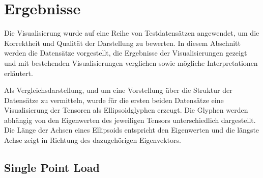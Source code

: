 \documentclass[a4paper,fontsize=12pt,toc=bib,halfparskip,ngerman]{scrartcl}
\begin{document}
\section{Ergebnisse}
\label{sec:Ergebnisse}
Die Visualisierung wurde auf eine Reihe von Testdatens\"atzen angewendet, um die Korrektheit und Qualit\"at der Darstellung zu bewerten. In diesem Abschnitt werden die Datens\"atze vorgestellt, die Ergebnisse der Visualisierungen gezeigt und mit bestehenden Visualisierungen verglichen sowie m\"ogliche Interpretationen erl\"autert.

Als Vergleichsdarstellung, und um eine Vorstellung \"uber die Struktur der Datens\"atze zu vermitteln, wurde f\"ur die ersten beiden Datens\"atze eine Visualisierung der Tensoren als Ellipsoidglyphen erzeugt. Die Glyphen werden abh\"angig von den Eigenwerten des jeweiligen Tensors unterschiedlich dargestellt. Die L\"ange der Achsen eines Ellipsoids entspricht den Eigenwerten und die l\"angste Achse zeigt in Richtung des dazugeh\"origen Eigenvektors.

\subsection{Single Point Load}
\end{document}
